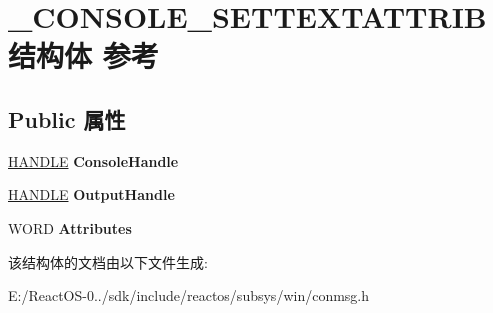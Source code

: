 \hypertarget{struct___c_o_n_s_o_l_e___s_e_t_t_e_x_t_a_t_t_r_i_b}{}\section{\+\_\+\+C\+O\+N\+S\+O\+L\+E\+\_\+\+S\+E\+T\+T\+E\+X\+T\+A\+T\+T\+R\+I\+B结构体 参考}
\label{struct___c_o_n_s_o_l_e___s_e_t_t_e_x_t_a_t_t_r_i_b}
\subsection*{Public 属性}
\begin{DoxyCompactItemize}
\item 
\mbox{\label{struct___c_o_n_s_o_l_e___s_e_t_t_e_x_t_a_t_t_r_i_b_aaaa1278e1aa0ceaca3b3da1478085f06}} 
\hyperlink{interfacevoid}{H\+A\+N\+D\+LE} {\bfseries Console\+Handle}
\item 
\mbox{\label{struct___c_o_n_s_o_l_e___s_e_t_t_e_x_t_a_t_t_r_i_b_adf7a29cd5cb38f14e46d36860a0b9a16}} 
\hyperlink{interfacevoid}{H\+A\+N\+D\+LE} {\bfseries Output\+Handle}
\item 
\mbox{\label{struct___c_o_n_s_o_l_e___s_e_t_t_e_x_t_a_t_t_r_i_b_ad245991674a198763210447ca5469ec8}} 
W\+O\+RD {\bfseries Attributes}
\end{DoxyCompactItemize}


该结构体的文档由以下文件生成\+:\begin{DoxyCompactItemize}
\item 
E\+:/\+React\+O\+S-\/0../sdk/include/reactos/subsys/win/conmsg.\+h\end{DoxyCompactItemize}
